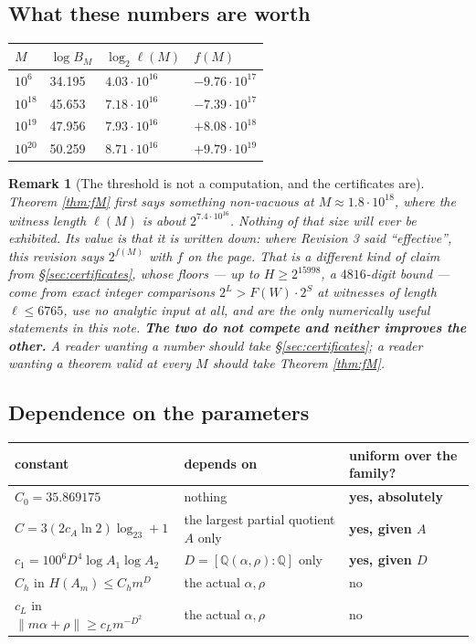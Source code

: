 \documentclass[11pt]{article}
\newtheorem*{remark}{Remark}
\newcommand{\Q}{\mathbb{Q}}
\begin{document}
\subsection{What these numbers are worth}

\begin{center}
\begin{tabular}{@{}llll@{}}
\toprule
$M$ & $\log B_M$ & $\log_2\ell(M)$ & $f(M)$ \\
\midrule
$10^{6}$ & 34.195 & $4.03\cdot10^{16}$ & $-9.76\cdot10^{17}$ \\
$10^{18}$ & 45.653 & $7.18\cdot10^{16}$ & $-7.39\cdot10^{17}$ \\
$10^{19}$ & 47.956 & $7.93\cdot10^{16}$ & $+8.08\cdot10^{18}$ \\
$10^{20}$ & 50.259 & $8.71\cdot10^{16}$ & $+9.79\cdot10^{19}$ \\
\bottomrule
\end{tabular}
\end{center}

\begin{remark}[The threshold is not a computation, and the certificates are]
\label{rem:twoscales}
Theorem \ref{thm:fM} first says something non-vacuous at $M\approx1.8\cdot10^{18}$, where the witness
length $\ell(M)$ is about $2^{7.4\cdot10^{16}}$. Nothing of that size will ever be exhibited. Its value
is that it is \emph{written down}: where Revision 3 said ``effective'', this revision says
$2^{f(M)}$ with $f$ on the page. That is a different kind of claim from \S\ref{sec:certificates},
whose floors --- up to $H\ge2^{15998}$, a $4816$-digit bound --- come from exact integer comparisons
$2^L>F(W)\cdot2^S$ at witnesses of length $\ell\le6765$, use no analytic input at all, and are the only
numerically useful statements in this note. \textbf{The two do not compete and neither improves the
other.} A reader wanting a number should take \S\ref{sec:certificates}; a reader wanting a theorem
valid at every $M$ should take Theorem \ref{thm:fM}.
\end{remark}

\subsection{Dependence on the parameters}

\begin{center}
\begin{tabular}{@{}lll@{}}
\toprule
constant & depends on & uniform over the family? \\
\midrule
$C_0=35.869175$ & nothing & \textbf{yes, absolutely} \\
$C=3(2c_A\ln2)\log_23+1$ & the largest partial quotient $A$ only & \textbf{yes, given $A$} \\
$c_1=100^6D^4\log A_1\log A_2$ & $D=[\Q(\alpha,\rho):\Q]$ only & \textbf{yes, given $D$} \\
$C_h$ in $H(A_m)\le C_hm^{D}$ & the actual $\alpha,\rho$ & no \\
$c_L$ in $\lVert m\alpha+\rho\rVert\ge c_Lm^{-D^2}$ & the actual $\alpha,\rho$ & no \\
\bottomrule
\end{tabular}
\end{center}
\end{document}
